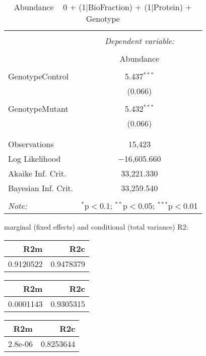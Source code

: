 \documentclass[11pt]{report}
\begin{document}
\begin{table}[!htbp] \centering 
  \caption{Abundance ~ 0 + (1|BioFraction) + (1|Protein) + Genotype} 
  \label{} 
\begin{tabular}{@{\extracolsep{5pt}}lc} 
\\[-1.8ex]\hline 
\hline \\[-1.8ex] 
 & \multicolumn{1}{c}{\textit{Dependent variable:}} \\ 
\cline{2-2} 
\\[-1.8ex] & Abundance \\ 
\hline \\[-1.8ex] 
 GenotypeControl & 5.437$^{***}$ \\ 
  & (0.066) \\ 
  & \\ 
 GenotypeMutant & 5.432$^{***}$ \\ 
  & (0.066) \\ 
  & \\ 
\hline \\[-1.8ex] 
Observations & 15,423 \\ 
Log Likelihood & $-$16,605.660 \\ 
Akaike Inf. Crit. & 33,221.330 \\ 
Bayesian Inf. Crit. & 33,259.540 \\ 
\hline 
\hline \\[-1.8ex] 
\textit{Note:}  & \multicolumn{1}{r}{$^{*}$p$<$0.1; $^{**}$p$<$0.05; $^{***}$p$<$0.01} \\ 
\end{tabular} 
\end{table} 
marginal (fixed effects) and conditional (total variance) R2:

\begin{tabular}{r|r}
\hline
R2m & R2c\\
\hline
0.9120522 & 0.9478379\\
\hline
\end{tabular}

\begin{tabular}{r|r}
\hline
R2m & R2c\\
\hline
0.0001143 & 0.9305315\\
\hline
\end{tabular}

\begin{tabular}{r|r}
\hline
R2m & R2c\\
\hline
2.8e-06 & 0.8253644\\
\hline
\end{tabular}
\end{document}
